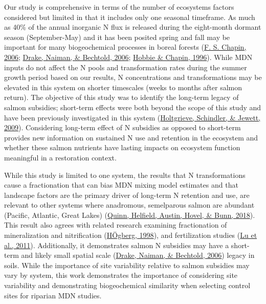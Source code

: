 \documentclass [11pt, proquest] {uwthesis}[2015/03/03]
\begin{document}
Our study is comprehensive in terms of the number of ecosystems factors considered but limited in that it includes only one seasonal timeframe. As much as 40\% of the annual inorganic N flux is released during the eight-month dormant season (September-May) and it has been posited spring and fall may be important for many biogeochemical processes in boreal forests (\protect\hyperlink{ref-Chapin2006}{F. S. Chapin, 2006}; \protect\hyperlink{ref-Drake2006}{Drake, Naiman, \& Bechtold, 2006}; \protect\hyperlink{ref-Hobbie1996}{Hobbie \& Chapin, 1996}). While MDN inputs do not affect the N pools and transformation rates during the summer growth period based on our results, N concentrations and transformations may be elevated in this system on shorter timescales (weeks to months after salmon return). The objective of this study was to identify the long-term legacy of salmon subsidies; short-term effects were both beyond the scope of this study and have been previously investigated in this system (\protect\hyperlink{ref-Holtgrieve2009}{Holtgrieve, Schindler, \& Jewett, 2009}). Considering long-term effect of N subsidies as opposed to short-term provides new information on sustained N use and retention in the ecosystem and whether these salmon nutrients have lasting impacts on ecosystem function meaningful in a restoration context.

While this study is limited to one system, the results that N transformations cause a fractionation that can bias MDN mixing model estimates and that landscape factors are the primary driver of long-term N retention and use, are relevant to other systems where anadromous, semelparous salmon are abundant (Pacific, Atlantic, Great Lakes) (\protect\hyperlink{ref-Quinn2018}{Quinn, Helfield, Austin, Hovel, \& Bunn, 2018}). This result also agrees with related research examining fractionation of mineralization and nitrification (\protect\hyperlink{ref-Hogberg1998}{HÖgberg, 1998}), and fertilization studies (\protect\hyperlink{ref-Lu2011}{Lu et al., 2011}). Additionally, it demonstrates salmon N subsidies may have a short-term and likely small spatial scale (\protect\hyperlink{ref-Drake2006}{Drake, Naiman, \& Bechtold, 2006}) legacy in soils. While the importance of site variability relative to salmon subsidies may vary by system, this work demonstrates the importance of considering site variability and demonstrating biogeochemical similarity when selecting control sites for riparian MDN studies.
\end{document}
